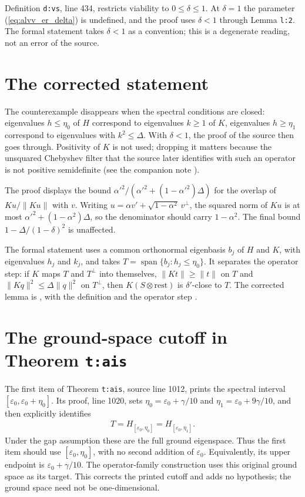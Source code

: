 \documentclass{article}
\begin{document}
Definition \texttt{d:vs}, line 434, restricts viability to
$0\le\delta\le1$. At $\delta=1$ the parameter (\ref{eq:alvv_er_delta}) is
undefined, and the proof uses $\delta<1$ through Lemma \texttt{l:2}. The
formal statement takes $\delta<1$ as a convention; this is a degenerate
reading, not an error of the source.

\section{The corrected statement}

The counterexample disappears when the spectral conditions are closed:
eigenvalues $h\le\eta_0$ of $H$ correspond to eigenvalues $k\ge1$ of $K$, eigenvalues $h\ge\eta_1$ correspond to
eigenvalues with $k^2\le\Delta$. With $\delta<1$, the proof of the source
then goes through. Positivity of $K$ is not used; dropping it matters
because the unsquared Chebyshev filter that the source later identifies with
such an operator is not positive semidefinite (see the companion note
).

The proof displays the bound
$\alpha'^2/(\alpha'^2+(1-\alpha'^2)\Delta)$ for the overlap of $Ku/\|Ku\|$
with $v$. Writing $u=\alpha v'+\sqrt{1-\alpha^2}\,v^\perp$, the squared norm
of $Ku$ is at most $\alpha'^2+(1-\alpha^2)\Delta$, so the denominator should
carry $1-\alpha^2$. The final bound $1-\Delta/(1-\delta)^2$ is unaffected.

The formal statement uses a common orthonormal eigenbasis $b_j$ of $H$ and
$K$, with eigenvalues $h_j$ and $k_j$, and takes
$T=\operatorname{span}\{b_j:h_j\le\eta_0\}$. It separates the operator step:
if $K$ maps $T$ and $T^\perp$ into themselves, $\|Kt\|\ge\|t\|$ on $T$ and
$\|Kq\|^2\le\Delta\|q\|^2$ on $T^\perp$, then $K(S\otimes\text{rest})$ is
$\delta'$-close to $T$. The corrected lemma is
, with the definition
 and the operator step
.

\section{The ground-space cutoff in Theorem \texttt{t:ais}}

The first item of Theorem \texttt{t:ais}, source line 1012, prints the
spectral interval $[\varepsilon_0,\varepsilon_0+\eta_0]$. Its proof, line
1020, sets $\eta_0=\varepsilon_0+\gamma/10$ and
$\eta_1=\varepsilon_0+9\gamma/10$, and then explicitly identifies
\begin{align}
    T=H_{[\varepsilon_0,\eta_0]}
      =H_{[\varepsilon_0,\eta_1]}.
\end{align}
Under the gap assumption these are the full ground eigenspace. Thus the
first item should use $[\varepsilon_0,\eta_0]$, with no second addition of
$\varepsilon_0$. Equivalently, its upper endpoint is
$\varepsilon_0+\gamma/10$. The operator-family construction uses this
original ground space as its target. This corrects the printed cutoff and
adds no hypothesis; the ground space need not be one-dimensional.
\end{document}
